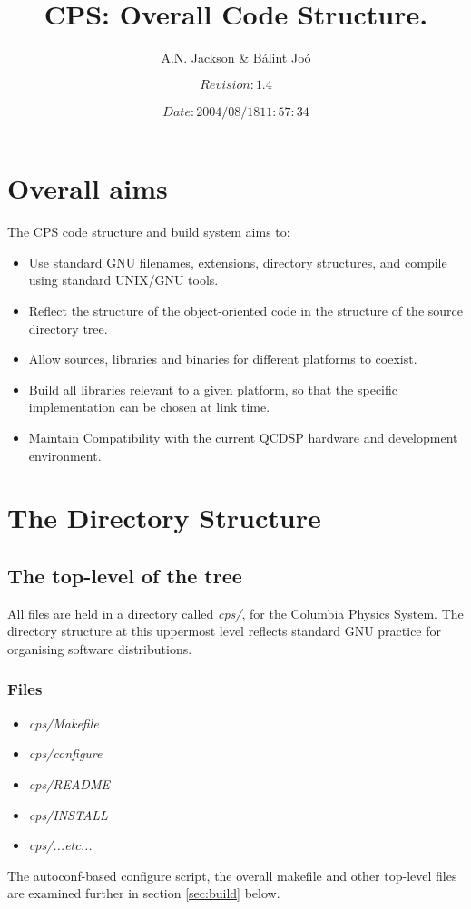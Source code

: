 \documentclass[12pt]{article}
\title{CPS: Overall Code Structure.}
\author{A.N. Jackson \& B\'{a}lint Jo\'{o}}
\date{\mbox{\small $$Revision: 1.4 $$  $$Date: 2004/08/18 11:57:34 $$}}
\begin{document}
\maketitle

\tableofcontents
\newpage

\section{Overall aims}
The CPS code structure and build system aims to:
\begin{itemize}
\setlength{\itemsep}{0.0cm}
 \item Use standard GNU filenames, extensions, directory structures, and
 compile using standard UNIX/GNU tools.
 \item Reflect the structure of the object-oriented code in the structure of
 the source directory tree.
 \item Allow sources, libraries and binaries for different platforms to coexist.
 \item Build all libraries relevant to a given platform, so that the specific
 implementation can be chosen at link time.
\item Maintain Compatibility with the current QCDSP hardware and development environment.
\end{itemize}

\section{The Directory Structure}
\label{sec:dirs}

\subsection{The top-level of the tree}
All files are held in a directory called \emph{cps/}, for the Columbia Physics System.
The directory structure at this uppermost level reflects standard GNU practice
for organising software distributions.

\subsubsection{Files}
\begin{itemize}
\setlength{\itemsep}{0.0cm}
 \item \emph{cps/Makefile}
 \item \emph{cps/configure}
 \item \emph{cps/README}
 \item \emph{cps/INSTALL}
 \item \emph{cps/...etc...}
\end{itemize}
The autoconf-based configure script, the overall makefile and other top-level 
files are examined further in section \ref{sec:build} below.
\end{document}
